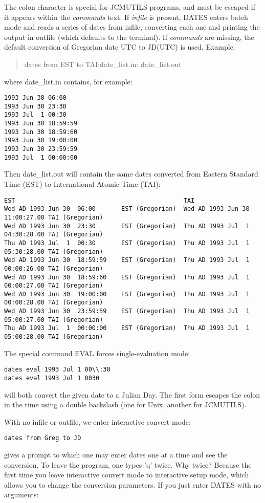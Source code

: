 \documentclass{article}
\begin{document}
The colon character is special for JCMUTILS programs, and
must be escaped if it appears within the {\it commands} text.
If {\it infile} is present, DATES enters batch mode and
reads a series of dates from infile, converting each one
and printing the output in outfile (which defaults to the
terminal). If {\it commands} are missing, the default
conversion of Gregorian date UTC to JD(UTC) is used. Example:
\begin{quote}
dates from EST to TAI:date\_list.in: date\_list.out
\end{quote}
where date\_list.in contains, for example:
\begin{verbatim}
1993 Jun 30 06:00
1993 Jun 30 23:30
1993 Jul  1 00:30
1993 Jun 30 18:59:59
1993 Jun 30 18:59:60
1993 Jun 30 19:00:00
1993 Jun 30 23:59:59
1993 Jul  1 00:00:00
\end{verbatim}
Then date\_list.out will contain the same dates converted
from Eastern Standard Time (EST) to International Atomic Time (TAI):
\begin{verbatim}
EST                                              TAI
Wed AD 1993 Jun 30  06:00       EST (Gregorian)  Wed AD 1993 Jun 30  11:00:27.00 TAI (Gregorian)
Wed AD 1993 Jun 30  23:30       EST (Gregorian)  Thu AD 1993 Jul  1  04:30:28.00 TAI (Gregorian)
Thu AD 1993 Jul  1  00:30       EST (Gregorian)  Thu AD 1993 Jul  1  05:30:28.00 TAI (Gregorian)
Wed AD 1993 Jun 30  18:59:59    EST (Gregorian)  Thu AD 1993 Jul  1  00:00:26.00 TAI (Gregorian)
Wed AD 1993 Jun 30  18:59:60    EST (Gregorian)  Thu AD 1993 Jul  1  00:00:27.00 TAI (Gregorian)
Wed AD 1993 Jun 30  19:00:00    EST (Gregorian)  Thu AD 1993 Jul  1  00:00:28.00 TAI (Gregorian)
Wed AD 1993 Jun 30  23:59:59    EST (Gregorian)  Thu AD 1993 Jul  1  05:00:27.00 TAI (Gregorian)
Thu AD 1993 Jul  1  00:00:00    EST (Gregorian)  Thu AD 1993 Jul  1  05:00:28.00 TAI (Gregorian)
\end{verbatim}


The special command EVAL forces single-evaluation mode:

\begin{verbatim}
dates eval 1993 Jul 1 00\\:30 
dates eval 1993 Jul 1 0030 
\end{verbatim}
will both convert the given date to a Julian Day. The first form
escapes the colon in the time using a double backslash (one for Unix,
another for JCMUTILS).

With no infile or outfile, we enter interactive convert mode:

\begin{verbatim}
dates from Greg to JD
\end{verbatim}
gives a prompt to which one may enter dates one at a time and
see the conversion. To leave the program, one types 'q' twice.
Why twice? Because the first time  you leave interactive
convert mode to interactive setup mode, which allows you
to change the conversion parameters.
If you just enter DATES with no arguments:
\end{document}
